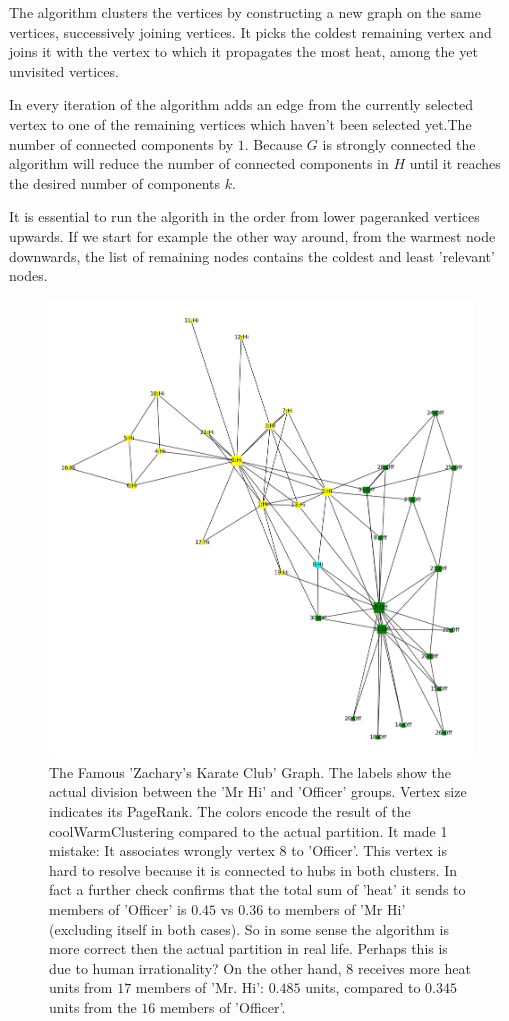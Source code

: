 \documentclass[a4paper,10pt]{article}
\theoremstyle{definition}
\theoremstyle{remark}
\theoremstyle{plain}
\begin{document}
The algorithm clusters the vertices by constructing a new graph on the same
vertices, successively joining vertices. It picks the coldest remaining vertex
and joins it with the vertex to which it propagates the most heat, among
the yet unvisited vertices.

In every iteration of the algorithm adds an edge from the currently
selected vertex to one of the remaining vertices which haven't been
selected yet.The
number of connected components by $1$. Because $G$ is
strongly connected the algorithm will reduce the number of connected
components in $H$ until it reaches the desired number of components
$k$.

It is essential to run the algorith in the order from lower pageranked
vertices upwards. If we start for example the other way around, from
the warmest node downwards, the list of remaining nodes contains the
coldest and least 'relevant' nodes.

\begin{figure}[!htb]
\begin{framed}
\centering
\includegraphics[width=0.75\linewidth]{Karate_coolwarmclustering.png}
\caption{
The Famous 'Zachary's Karate Club' Graph. The labels show the actual division
between the 'Mr Hi' and 'Officer' groups.
Vertex size indicates its PageRank.
The colors encode the result of the coolWarmClustering compared to the actual
partition. It made 1 mistake:
It associates wrongly vertex 8 to 'Officer'.  This vertex
is hard to resolve because it is connected to hubs in both clusters.
In fact a further check confirms that the total sum of 'heat' it sends to members of
'Officer' is $0.45$ vs $0.36$ to members of 'Mr Hi' (excluding itself in both
cases). So in some sense the algorithm is more correct then the actual
partition in real life. Perhaps this is due to human irrationality?
On the other hand, $8$ receives more heat units from $17$ members of 'Mr. Hi': $0.485$
units, compared to $0.345$ units from the $16$ members of 'Officer'. 
}
\label{fig:karatecoolwarm}
\end{framed}
\end{figure}
\end{document}
